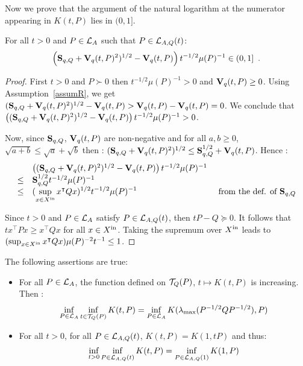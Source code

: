 \documentclass[10pt]{article}
\begin{document}
Now we prove that the argument of the natural logarithm at the numerator appearing in $K(t,P)$ lies in $(0,1]$. 

\begin{lemma}
For all $t>0$ and $P\in\mathcal{L}_{A}$ such that $P\in\mathcal{L}_{A,Q}(t)$: \[
\left(\mathbf{S}_{q,Q}+\mathbf{V}_{q}(t,P)^2)^{1/2}-\mathbf{V}_{q}(t,P)\right) t^{-1/2}\mu(P)^{-1}\in (0,1]\enspace .
\]
\end{lemma}

\begin{proof}
First $t>0$ and $P\succ 0$ then $t^{-1/2}\mu(P)^{-1}>0$ and $\mathbf{V}_{q}(t,P)\geq 0$. Using Assumption~\ref{assumR}, we get $(\mathbf{S}_{q,Q}+\mathbf{V}_{q}(t,P)^2)^{1/2}-\mathbf{V}_{q}(t,P)> \mathbf{V}_{q}(t,P)-\mathbf{V}_{q}(t,P)=0$. We conclude that $\left((\mathbf{S}_{q,Q}+\mathbf{V}_{q}(t,P)^2)^{1/2}-\mathbf{V}_{q}(t,P)\right) t^{-1/2}\mu(P)^{-1}>0$. 

Now, since $\mathbf{S}_{q,Q}$, $\mathbf{V}_{q}(t,P)$ are non-negative and for all $a,b\geq 0$, $\sqrt{a+b}\leq \sqrt{a}+\sqrt{b}$  then : 
$(\mathbf{S}_{q,Q}+\mathbf{V}_{q}(t,P)^2)^{1/2}\leq \mathbf{S}_{q,Q}^{1/2}+\mathbf{V}_{q}(t,P)$. Hence : 
\[
\begin{array}{lll}
&\left((\mathbf{S}_{q,Q}+\mathbf{V}_{q}(t,P)^2)^{1/2}-\mathbf{V}_{q}(t,P)\right) t^{-1/2}\mu(P)^{-1}& \\
\leq &\mathbf{S}_{q,Q}^{1/2} t^{-1/2}\mu(P)^{-1} & \\
\leq &(\displaystyle{\sup_{x\in X^\mathrm{in}} x^\intercal Q x})^{1/2} t^{-1/2}\mu(P)^{-1} & \text{ from the def. of } \mathbf{S}_{q,Q}
\end{array}
\]

Since $t>0$ and $P\in\mathcal{L}_{A}$ satisfy $P\in\mathcal{L}_{A,Q}(t)$, then $t P-Q\succeq 0$. It follows that 
$t x^\intercal P x\geq x^\intercal Q x$ for all $x\in X^\mathrm{in}$. Taking the supremum over $X^\mathrm{in}$ leads to $(\sup_{x\in X^\mathrm{in}} x^\intercal Q x)\mu(P)^{-2}t^{-1} \leq 1$. 
\end{proof}

\begin{prop}
\label{comp-prop}
The following assertions are true:
\begin{itemize}
\item For all $P\in\mathcal{L}_{A}$, the function defined on $\mathcal{T}_{Q}(P)$, $t\mapsto K(t,P)$ is increasing. Then : 
\begin{equation}
\label{infsolved}
\inf_{P\in\mathcal{L}_{A}} \inf_{t\in\mathcal{T}_{Q}(P)} K(t,P)=\inf_{P\in\mathcal{L}_{A}}K(\lambda_{\operatorname{max}}(P^{-1/2} Q P^{-1/2}),P)
\end{equation}
\item For all $t>0$, for all $P\in\mathcal{L}_{A,Q}(t)$, $K(t,P)=K(1,tP)$ and thus:
\[
\inf_{t>0} \inf_{P\in\mathcal{L}_{A,Q}(t)} K(t,P)=\inf_{P\in\mathcal{L}_{A,Q}(1)} K(1,P)
\]
\end{itemize}
\end{prop}
\end{document}
